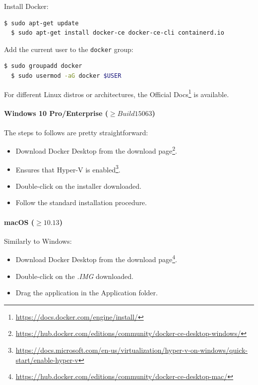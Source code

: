 \noindent Install Docker:
\begin{lstlisting}[language=bash]
  $ sudo apt-get update
  $ sudo apt-get install docker-ce docker-ce-cli containerd.io
\end{lstlisting}

\noindent Add the current user to the \texttt{docker} group:
\begin{lstlisting}[language=bash]
  $ sudo groupadd docker
  $ sudo usermod -aG docker $USER
\end{lstlisting}

\noindent For different Linux distros or architectures, the Official Docs\footnote{\url{https://docs.docker.com/engine/install/}} is available.

\paragraph{Windows 10 Pro/Enterprise ($\geq Build 15063$)} The steps to follows are pretty straightforward:

\begin{itemize}
    \item[1.] Download Docker Desktop from the download page\footnote{\url{https://hub.docker.com/editions/community/docker-ce-desktop-windows/}}.
    \item[2.] Ensures that Hyper-V is enabled\footnote{\url{https://docs.microsoft.com/en-us/virtualization/hyper-v-on-windows/quick-start/enable-hyper-v}}.
    \item[3.] Double-click on the installer downloaded.
    \item[4.] Follow the standard installation procedure.
\end{itemize}

\paragraph{macOS ($\geq 10.13$)} Similarly to Windows:

\begin{itemize}
    \item[1.] Download Docker Desktop from the download page\footnote{\url{https://hub.docker.com/editions/community/docker-ce-desktop-mac/}}.
    \item[2.] Double-click on the \textit{.IMG} downloaded.
    \item[3.] Drag the application in the Application folder.
\end{itemize}

\newpage

